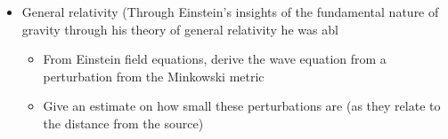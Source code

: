
\begin{itemize}
\item General relativity (Through Einstein’s insights of the fundamental nature of gravity through his theory of general relativity he was abl
\begin{itemize}
\item From Einstein field equations, derive the wave equation from a perturbation from the Minkowski metric
\item Give an estimate on how small these perturbations are (as they relate to the distance from the source)
\end{itemize}
\end{itemize}

